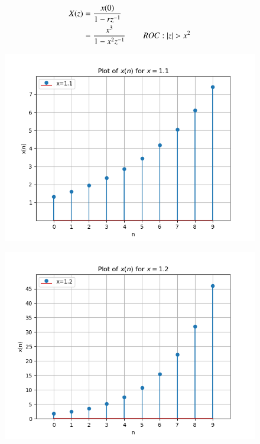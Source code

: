 \documentclass[journal,12pt,twocolumn]{IEEEtran}
\theoremstyle{remark}
\begin{document}
\begin{align}
	X(z) &= \frac{x(0)}{1-rz^{-1}} \\
	&= \frac{x^3}{1-x^2z^{-1}} \hspace{0.75cm} ROC:|z|>x^2
\end{align}
\begin{figure}[ht!]

	\includegraphics[width=\columnwidth]{figs/plot_1.png}
	\caption{}
	\label{fig:1.1}
\end{figure}
\begin{figure}[ht!]
	\includegraphics[width=\columnwidth]{figs/plot_2.png}
	\caption{}
	\label{fig:1.2}
\end{figure}
\end{document}

